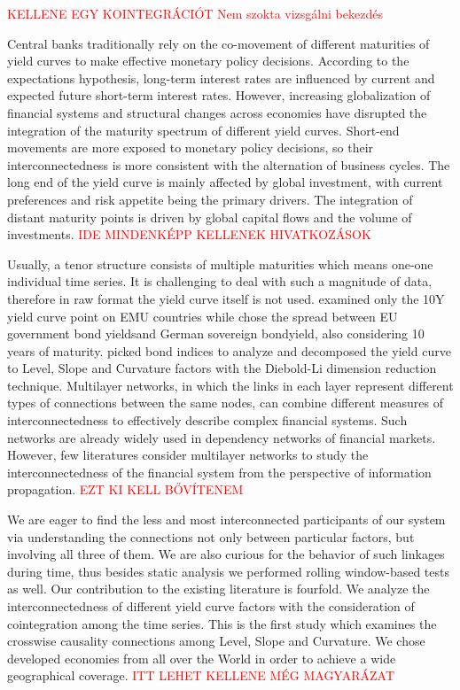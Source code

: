 \documentclass[12pt,bibliography=totoc]{article}
\begin{document}
\smallskip{}
\textcolor{red}{KELLENE EGY KOINTEGRÁCIÓT Nem szokta vizsgálni bekezdés}
\smallskip{}

Central banks traditionally rely on the co-movement of different maturities of yield curves to make effective monetary policy decisions. According to the expectations hypothesis, long-term interest rates are influenced by current and expected future short-term interest rates. However, increasing globalization of financial systems and structural changes across economies have disrupted the integration of the maturity spectrum of different yield curves. Short-end movements are more exposed to monetary policy decisions, so their interconnectedness is more consistent with the alternation of business cycles. The long end of the yield curve is mainly affected by global investment, with current preferences and risk appetite being the primary drivers. The integration of distant maturity points is driven by global capital flows and the volume of investments. \textcolor{red}{IDE MINDENKÉPP KELLENEK HIVATKOZÁSOK}

Usually, a tenor structure consists of multiple maturities which means one-one individual time series. It is challenging to deal with such a magnitude of data, therefore in raw format the yield curve itself is not used. \cite{fernandez2016using} examined only the 10Y yield curve point on EMU countries while \cite{claeys2014measuring} chose the spread between EU government bond yieldsand German sovereign bondyield, also considering 10 years of maturity. \cite{ahmad2018financial} picked bond indices to analyze and \cite{sowmya2016linkages}
decomposed the yield curve to Level, Slope and Curvature factors with the Diebold-Li dimension reduction technique. Multilayer networks, in which the links in each layer represent different types of connections between the same nodes, can combine different measures of interconnectedness to effectively describe complex financial systems. Such networks are already widely used in dependency networks of financial markets. However, few literatures consider multilayer networks to study the interconnectedness of the financial system from the perspective of information propagation. \textcolor{red}{EZT KI KELL BŐVÍTENEM}

We are eager to find the less and most interconnected participants of our system via understanding the connections not only between particular factors, but involving all three of them. We are also curious for the behavior of such linkages during time, thus besides static analysis we performed rolling window-based tests as well. Our contribution to the existing literature is fourfold. We analyze the interconnectedness of different yield curve factors with the consideration of cointegration among the time series. This is the first study which examines the crosswise causality connections among Level, Slope and Curvature. We chose developed economies from all over the World in order to achieve a wide geographical coverage. \textcolor{red}{ITT LEHET KELLENE MÉG MAGYARÁZAT}
\end{document}
